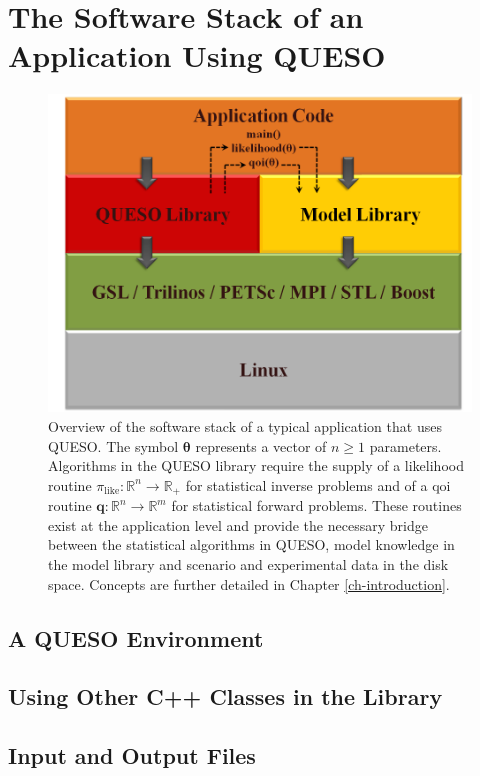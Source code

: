 \section{The Software Stack of an Application Using QUESO}

\begin{figure}[h!]
\centerline{
\includegraphics[scale=0.50,clip=true]{figs/queso_paper1_03}
}
\caption{
Overview of the software stack of a typical application that uses QUESO.
The symbol $\boldsymbol{\theta}$ represents a vector of $n\geqslant 1$ parameters.
Algorithms in the QUESO library require the supply
of a likelihood routine $\pi_{\text{like}}:\mathbb{R}^n\rightarrow\mathbb{R}_+$ for statistical inverse problems and 
of a qoi routine $\mathbf{q}:\mathbb{R}^n\rightarrow\mathbb{R}^m$ for statistical forward problems. These routines
exist at the application level and provide the necessary bridge between the statistical algorithms in QUESO,
model knowledge in the model library and scenario and experimental data in the disk space.
Concepts are further detailed in Chapter \ref{ch-introduction}.
}
\label{fig-sw-stack}
\end{figure}

\subsection{A QUESO Environment}

\subsection{Using Other C++ Classes in the Library}

\subsection{Input and Output Files}

